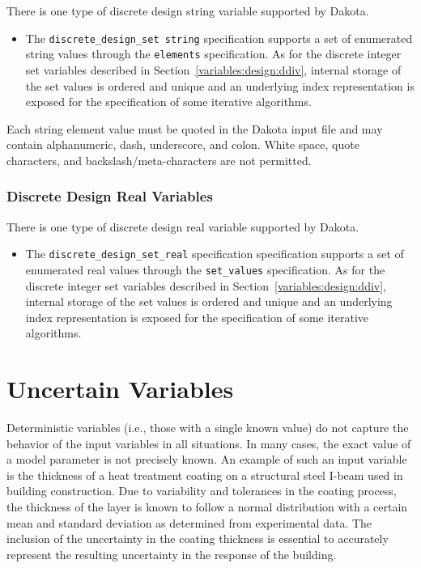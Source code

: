 There is one type of discrete design string variable supported by
Dakota.
\begin{itemize}

\item The \texttt{discrete\_design\_set string} specification
supports a set of enumerated string values through the
\texttt{elements} specification.  As for the discrete integer
set variables described in Section~\ref{variables:design:ddiv},
internal storage of the set values is ordered and unique and an
underlying index representation is exposed for the specification of
some iterative algorithms.

\end{itemize}
Each string element value must be quoted in the Dakota input file and
may contain alphanumeric, dash, underscore, and colon. White space,
quote characters, and backslash/meta-characters are not permitted.

\subsubsection{Discrete Design Real Variables}\label{variables:design:ddrv}

There is one type of discrete design real variable supported by
Dakota.
\begin{itemize}

\item The \texttt{discrete\_design\_set\_real} specification
specification supports a set of enumerated real values through the
\texttt{set\_values} specification.  As for the discrete integer
set variables described in Section~\ref{variables:design:ddiv},
internal storage of the set values is ordered and unique and an
underlying index representation is exposed for the specification of
some iterative algorithms.

\end{itemize}


\section{Uncertain Variables}\label{variables:uncertain}


Deterministic variables (i.e., those with a single known value) do not
capture the behavior of the input variables in all situations. In many
cases, the exact value of a model parameter is not precisely known. An
example of such an input variable is the thickness of a heat treatment
coating on a structural steel I-beam used in building construction.
Due to variability and tolerances in the coating process, the
thickness of the layer is known to follow a normal distribution with a
certain mean and standard deviation as determined from experimental
data. The inclusion of the uncertainty in the coating thickness is
essential to accurately represent the resulting uncertainty in the
response of the building.

